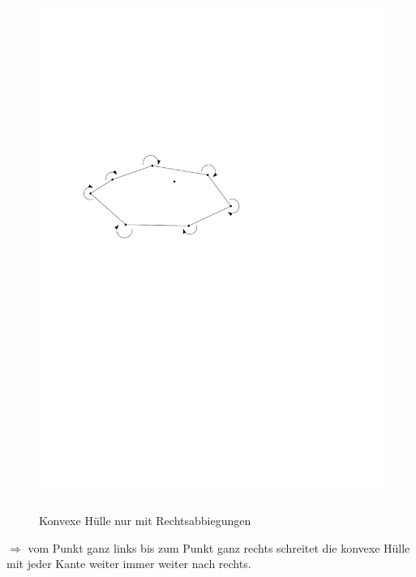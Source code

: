 \begin{frame}
\begin{figure}[htbp]
\begin{minipage}[b]{.48\linewidth}
    \includegraphics[width=\linewidth]{bilder/konvexRechts}
    \\
    \\
    \small{Konvexe Hülle nur mit Rechtsabbiegungen}
    \end{minipage}
\end{figure}
\pause
$\Rightarrow$ vom Punkt ganz links bis zum Punkt ganz rechts schreitet die konvexe Hülle mit jeder Kante weiter immer weiter nach rechts.
\end{frame}


